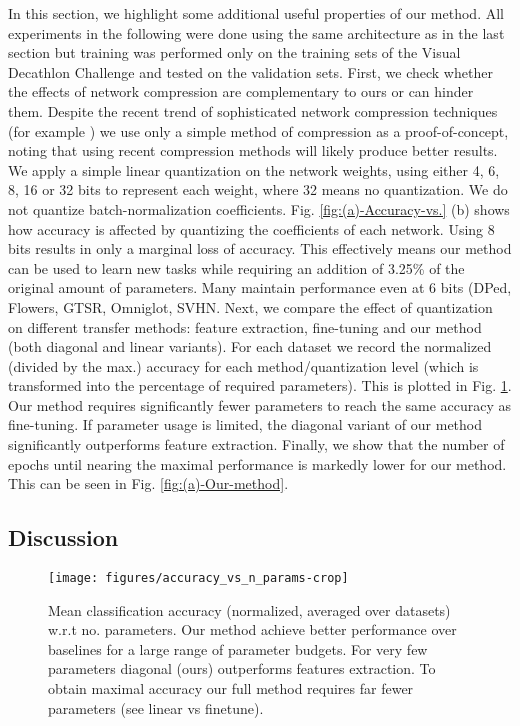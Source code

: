 \documentclass[10pt,journal,compsoc]{IEEEtran}
\begin{document}
In this section, we highlight some additional useful properties of
our method. All experiments in the following were done using the same
architecture as in the last section but training was performed only
on the training sets of the Visual Decathlon Challenge and tested
on the validation sets. First, we check whether the effects of network
compression are complementary to ours or can hinder them. Despite
the recent trend of sophisticated network compression techniques (for
example \cite{han2015deep}) we use only a simple method of compression
as a proof-of-concept, noting that using recent compression methods
will likely produce better results. We apply a simple linear quantization
on the network weights, using either 4, 6, 8, 16 or 32 bits to represent
each weight, where 32 means no quantization. We do not quantize batch-normalization
coefficients. Fig. \ref{fig:(a)-Accuracy-vs.} (b) shows how accuracy
is affected by quantizing the coefficients of each network. Using
8 bits results in only a marginal loss of accuracy. This effectively
means our method can be used to learn new tasks while requiring an
addition of 3.25\% of the original amount of parameters. Many maintain
performance even at 6 bits (DPed, Flowers, GTSR, Omniglot, SVHN. Next,
we compare the effect of quantization on different transfer methods:
feature extraction, fine-tuning and our method (both diagonal and
linear variants). For each dataset we record the normalized (divided
by the max.) accuracy for each method/quantization level (which is
transformed into the percentage of required parameters). This is plotted
in Fig. \ref{fig:Mean-classification-quantization}. Our method requires
significantly fewer parameters to reach the same accuracy as fine-tuning.
If parameter usage is limited, the diagonal variant of our method
significantly outperforms feature extraction. Finally, we show that
the number of epochs until nearing the maximal performance is markedly
lower for our method. This can be seen in Fig. \ref{fig:(a)-Our-method}. 

\subsection{Discussion}

\begin{figure}
\texttt{[image: figures/accuracy\_vs\_n\_params-crop]}

\caption{\label{fig:Mean-classification-quantization}Mean classification accuracy
(normalized, averaged over datasets) w.r.t no. parameters. Our method
achieve better performance over baselines for a large range of parameter
budgets. For very few parameters diagonal (ours) outperforms features
extraction. To obtain maximal accuracy our full method requires far
fewer parameters (see linear vs finetune). }

\end{figure}
\end{document}

